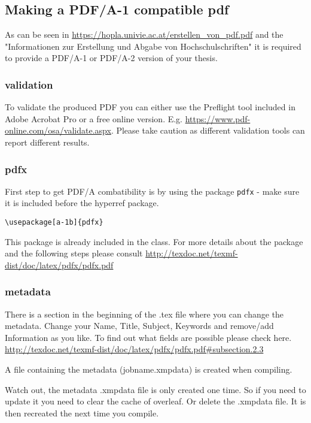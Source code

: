 \subsection{Making a PDF/A-1 compatible pdf}
As can be seen in \url{https://hopla.univie.ac.at/erstellen_von_pdf.pdf} and the "Informationen zur Erstellung und Abgabe von Hochschulschriften" it is required to provide a PDF/A-1 or PDF/A-2 version of your thesis.

\subsubsection{validation}
To validate the produced PDF you can either use the Preflight tool included in Adobe Acrobat Pro or a free online version. E.g. \url{https://www.pdf-online.com/osa/validate.aspx}.
Please take caution as different validation tools can report different results.

\subsubsection{pdfx}
First step to get PDF/A combatibility is by using the package \verb|pdfx| - make sure it is included before the hyperref package.
\begin{verbatim}
\usepackage[a-1b]{pdfx}
\end{verbatim}
This package is already included in the class.
For more details about the package and the following steps please consult \url{http://texdoc.net/texmf-dist/doc/latex/pdfx/pdfx.pdf}

\subsubsection{metadata}
There is a section in the beginning of the .tex file where you can change the metadata.
Change your Name, Title, Subject, Keywords and remove/add Information as you like. To find out what fields are possible please check here. \url{http://texdoc.net/texmf-dist/doc/latex/pdfx/pdfx.pdf#subsection.2.3}

A file containing the metadata (jobname.xmpdata) is created when compiling. 

Watch out, the metadata .xmpdata file is only created one time. So if you need to update it you need to clear the cache of overleaf. Or delete the .xmpdata file. It is then recreated the next time you compile. 

